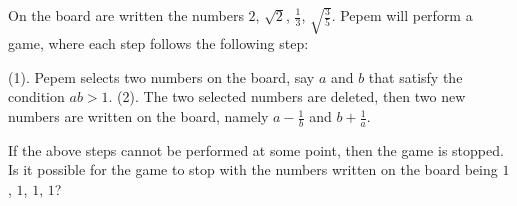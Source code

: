\begin{problem}
    On the board are written the numbers $2$, $\sqrt{2}$, $\frac{1}{3}$, $\sqrt{\frac{3}{5}}$. Pepem will perform a game, where each step follows the following step:

(1). Pepem selects two numbers on the board, say $a$ and $b$ that satisfy the condition $ab>1$.
(2). The two selected numbers are deleted, then two new numbers are written on the board, namely $a-\frac{1}{b}$ and $b+\frac{1}{a}$.

If the above steps cannot be performed at some point, then the game is stopped. Is it possible for the game to stop with the numbers written on the board being $1$, $1$, $1$, $1$?
\end{problem}